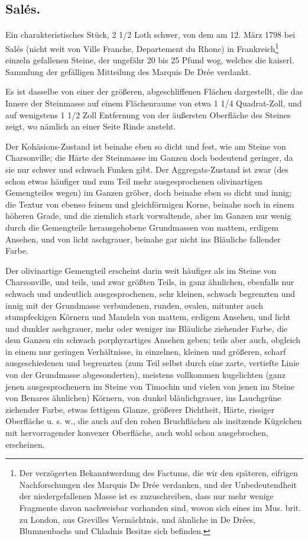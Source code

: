 \documentclass[a4paper, 11pt, oneside, german]{article}
\begin{document}
\subsection{Salés.}
\paragraph{}
Ein charakteristisches Stück, 2 1/2 Loth schwer, von dem am 12. März 1798 bei Salés (nicht weit von Ville Franche, Departement du Rhone) in Frankreich\footnote{Der verzögerten Bekanntwerdung des Factums, die wir den späteren, eifrigen Nachforschungen des Marquis De Drée verdanken, und der Unbedeutendheit der niedergefallenen Masse ist es zuzuschreiben, dass nur mehr wenige Fragmente davon nachweisbar vorhanden sind, wovon sich eines im Mus. brit. zu London, aus Grevilles Vermächtnis, und ähnliche in De Drées, Blumnenbachs und Chladnis Besitze sich befinden.} einzeln gefallenen Steine, der ungefähr 20 bis 25 Pfund wog, welches die kaiserl. Sammlung der gefälligen Mitteilung des Marquis De Drée verdankt.

Es ist dasselbe von einer der größeren, abgeschliffenen Flächen dargestellt, die das Innere der Steinmasse auf einem Flächenraume von etwa 1 1/4 Quadrat-Zoll, und auf wenigstens 1 1/2 Zoll Entfernung von der äußersten Oberfläche des Steines zeigt, wo nämlich an einer Seite Rinde ansteht.

Der Kohäsions-Zustand ist beinahe eben so dicht und fest, wie am Steine von Charsonville; die Härte der Steinmasse im Ganzen doch bedeutend geringer, da sie nur schwer und schwach Funken gibt. Der Aggregats-Zustand ist zwar (des schon etwas häufiger und zum Teil mehr ausgesprochenen olivinartigen Gemengteiles wegen) im Ganzen gröber, doch beinahe eben so dicht und innig; die Textur von ebenso feinem und gleichförmigen Korne, beinahe noch in einem höheren Grade, und die ziemlich stark vorwaltende, aber im Ganzen nur wenig durch die Gemengteile herausgehobene Grundmassen von mattem, erdigem Ansehen, und von licht aschgrauer, beinahe gar nicht ins Bläuliche fallender Farbe.

Der olivinartige Gemengteil erscheint darin weit häufiger als im Steine von Charsonville, und teils, und zwar größten Teils, in ganz ähnlichen, ebenfalls nur schwach und undeutlich ausgesprochenen, sehr kleinen, schwach begrenzten und innig mit der Grundmasse verbundenen, runden, ovalen, mitunter auch stumpfeckigen Körnern und Mandeln von mattem, erdigem Ansehen, und licht und dunkler aschgrauer, mehr oder weniger ins Bläuliche ziehender Farbe, die dem Ganzen ein schwach porphyrartiges Ansehen geben; teils aber auch, obgleich in einem nur geringen Verhältnisse, in einzelnen, kleinen und größeren, scharf ausgeschiedenen und begrenzten (zum Teil selbst durch eine zarte, vertiefte Linie von der Grundmasse abgesonderten), meistens vollkommen kugelichten (ganz jenen ausgesprochenern im Steine von Timochin und vielen von jenen im Steine von Benares ähnlichen) Körnern, von dunkel bläulichgrauer, ins Lauchgrüne ziehender Farbe, etwas fettigem Glanze, größerer Dichtheit, Härte, rissiger Oberfläche u. s. w., die auch auf den rohen Bruchflächen als insitzende Kügelchen mit hervorragender konvexer Oberfläche, auch wohl schon ausgebrochen, erscheinen.
\end{document}

